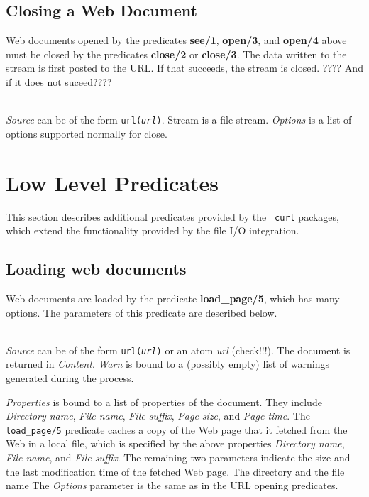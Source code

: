 \subsection{Closing a Web Document}

Web documents opened by the predicates {\bf see/1}, {\bf open/3}, and {\bf
  open/4} above must be closed by the predicates {\bf close/2} or {\bf
  close/3}. The data written to the stream is first posted to the URL.
If that succeeds, the stream is closed. ???? And if it does not suceed????

\begin{description}

\item[close({\it +Stream, +Source})]\mbox{}
\item[close({\it +Stream, +Source, +Options})]\mbox{}
  \\
{\it Source} can be of the form {\tt url({\it {url}})}. Stream is a file stream. {\it Options} is a list of options supported normally for close.

\end{description}


\section{Low Level Predicates}

This section describes additional predicates provided by the {\tt
  curl} packages, which extend the functionality provided by the file I/O
integration.

\subsection{Loading web documents}

Web documents are loaded by the predicate {\bf load\_page/5}, which has
many options. The parameters of this predicate are described below.


\begin{description}
\item[load\_page({\it +Source, +Options, -Properties, -Content, -Warn})]\mbox{}
  \\
  {\it Source} can be of the form {\tt url({\it {url}})} or an atom
  \emph{url} (check!!!). 
  The document is returned in {\it Content}.
  {\it Warn} is bound to a (possibly empty) list of warnings generated during the process.

  {\it Properties} is bound to a list of properties of the document. They
  include {\it Directory name}, {\it File name}, {\it File suffix}, {\it
    Page size}, and {\it Page time}.
  The {\tt load\_page/5}  predicate caches a copy of the Web page that it
  fetched from the Web in a local file, which is specified by the above
  properties \emph{Directory name}, \emph{File name}, and \emph{File
    suffix}. The remaining two parameters indicate the size and the last
  modification time of the fetched Web page.
  The directory and the file name 
  The \emph{Options} parameter is the same as in the URL opening
  predicates. 

\end{description}


